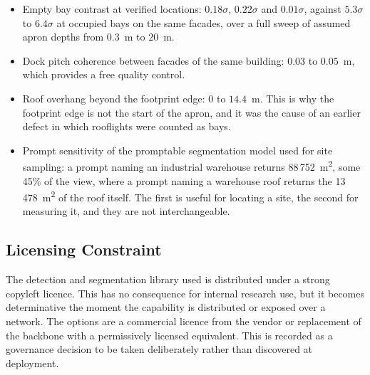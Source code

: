 \begin{itemize}
    \item Empty bay contrast at verified locations: $0.18\sigma$, $0.22\sigma$ and
    $0.01\sigma$, against $5.3\sigma$ to $6.4\sigma$ at occupied bays on the same facades,
    over a full sweep of assumed apron depths from $0.3$~m to $20$~m.
    \item Dock pitch coherence between facades of the same building: $0.03$ to $0.05$~m,
    which provides a free quality control.
    \item Roof overhang beyond the footprint edge: $0$ to $14.4$~m. This is why the footprint
    edge is not the start of the apron, and it was the cause of an earlier defect in which
    rooflights were counted as bays.
    \item Prompt sensitivity of the promptable segmentation model used for site sampling: a
    prompt naming an industrial warehouse returns 88\,752~m\textsuperscript{2}, some 45\% of
    the view, where a prompt naming a warehouse roof returns the
    13\,478~m\textsuperscript{2} of the roof itself. The first is useful for locating a site,
    the second for measuring it, and they are not interchangeable.
\end{itemize}

\subsection*{Licensing Constraint}

The detection and segmentation library used is distributed under a strong copyleft licence.
This has no consequence for internal research use, but it becomes determinative the moment
the capability is distributed or exposed over a network. The options are a commercial licence
from the vendor or replacement of the backbone with a permissively licensed equivalent. This
is recorded as a governance decision to be taken deliberately rather than discovered at
deployment.

